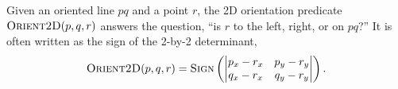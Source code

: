 Given an oriented line $pq$ and a point $r$, the 2D orientation predicate
$\textsc{Orient2D}(p, q, r)$ answers the question, ``is $r$ to the left, right,
or on $pq$?'' It is often written as the sign of the 2-by-2 determinant, $$
\textsc{Orient2D}(p, q, r) = \textsc{Sign}\left( \begin{vmatrix} p_x-r_x &
p_y-r_y \\ q_x-r_x & q_y-r_y \end{vmatrix} \right).$$















































% 
% 
% 
% 
% 
